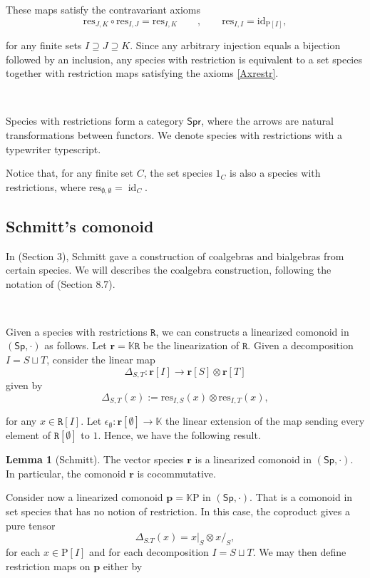 \documentclass[12pt, reqno]{amsart}
\theoremstyle{definition}
\newtheorem{lm}[thm]{Lemma}
\DeclareMathOperator{\id}{id}
\newcommand{\Ss}{\mathsf{Sp}} %
\newcommand{\Spr}{\mathsf{Spr}} %
\newcommand{\rP}{\mathrm{P}}
\newcommand{\prR}{\mathtt{R}}
\newcommand{\tp}{\mathbf{p}}
\newcommand{\trr}{\mathbf{r}}
\begin{document}
These maps satisfy the contravariant axioms
\begin{equation}\label{Axrestr}
    \text{res}_{J,K}\circ\text{res}_{I,J}=\text{res}_{I,K} \qquad , \qquad \text{res}_{I,I}=\text{id}_{\rP[I]},
\end{equation}

for any finite sets $I \supseteq J \supseteq K$. 
Since any arbitrary injection equals a bijection followed by an inclusion, any species with restriction is equivalent to a set species together with restriction maps satisfying the axioms \eqref{Axrestr}.

\

Species with restrictions form a category $\Spr$, where the arrows are natural transformations between functors.
We denote species with restrictions with a typewriter typescript.

Notice that, for any finite set $C$, the set species $\mathrm{1}_C$ is also a species with restrictions, where $\text{res}_{\emptyset, \emptyset} = \id_C$.
\

\subsection{Schmitt's comonoid}
In \cite{Schmitt1993} (Section 3), Schmitt gave a construction of coalgebras and bialgebras from certain species. We will describes the coalgebra construction, following the notation of \cite{AM2010} (Section 8.7).

\

Given a species with restrictions $\prR$, we can constructs a linearized comonoid in $(\Ss, \cdot)$ as follows. Let $\trr=\mathbb{K}\prR$ be the linearization of $\prR$. Given a decomposition $I=S \sqcup T$, consider the linear map
\[
\Delta_{S,T}: \trr[I]\to \trr[S] \otimes \trr[T]
\]
given by
\[\Delta_{S,T}(x):=\text{res}_{I,S}(x)\otimes \text{res}_{I,T}(x),\]

for any $x \in \prR[I]$. Let $\epsilon_\emptyset: \trr[\emptyset]\to \mathbb{K}$ the linear extension of the map sending every element of $\prR[\emptyset]$ to $1$. Hence, we have the following result.

\begin{lm}[Schmitt]
The vector species $\trr$ is a linearized comonoid in $(\Ss, \cdot)$. In particular, the comonoid $\trr$ is cocommutative.
\end{lm}


Consider now a linearized comonoid $\tp=\mathbb{K}\rP$ in $(\Ss, \cdot)$. 
That is a comonoid in set species that has no notion of restriction.
In this case, the coproduct gives a pure tensor
\[\Delta_{S.T}(x)=x|_S \otimes x/_S,\]
for each $x \in \rP[I]$ and for each decomposition $I = S \sqcup T$. We may then define restriction maps on $\tp$ either by
\end{document}
